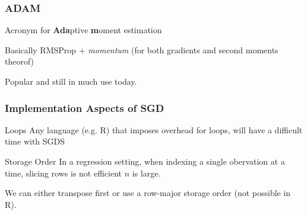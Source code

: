 \documentclass[aspectratio=1610,onlytextwidth]{beamer}
\begin{document}
\begin{frame}[c]
  \frametitle{ADAM}

  Acronym for \textbf{Ada}ptive \textbf{m}oment estimation

  \medskip

  Basically RMSProp + \emph{momentum} (for both gradients and second moments theorof)

  \medskip

  Popular and still in much use today.

\end{frame}

\begin{frame}[c]
  \frametitle{Implementation Aspects of SGD}

  \begin{block}{Loops}
    Any language (e.g. R) that imposes overhead for loops, will have a difficult time with SGDS
  \end{block}

  \pause

  \begin{block}{Storage Order}
    In a regression setting, when indexing a single obervation at a time, slicing rows is not efficient
    $n$ is large.

    \medskip

    We can either transpose first or use a row-major storage order (not possible in R).
  \end{block}
\end{frame}
\end{document}
